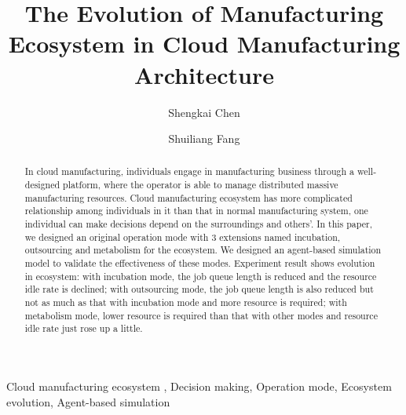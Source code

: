 
\title{The Evolution of Manufacturing Ecosystem in Cloud Manufacturing Architecture
}

\author[add1]{Shengkai Chen}
\author[add1,add2]{Shuiliang Fang}
\address[add2]{The State Key Laboratory of Fluid Power Transmission and Control, College of Mechanical Engineering, Zhejiang University, Hangzhou, 310027, China}
\address[add1]{Key Laboratory of Advanced Manufacturing Technology of Zhejiang Province, College of Mechanical Engineering, Zhejiang University, Hangzhou , 310027, China}



\begin{abstract}
In cloud manufacturing, individuals engage in manufacturing business through a well-designed platform, where the operator is able to manage distributed massive manufacturing resources. 
Cloud manufacturing ecosystem has more complicated relationship among individuals in it than that in normal manufacturing system, one individual can make decisions depend on the surroundings and others'. In this paper, we designed an original operation mode with 3 extensions named incubation, outsourcing and metabolism for the ecosystem. We designed an agent-based simulation model to validate the effectiveness of these modes. Experiment result shows evolution in ecosystem: with incubation mode, the job queue length is reduced and the resource idle rate is declined; with outsourcing mode, the job queue length is also reduced but not as much as that with incubation mode and more resource is required; with metabolism mode, lower resource is required than that with other modes and resource idle rate just rose up a little.

\end{abstract}

\begin{keyword}
Cloud manufacturing ecosystem \sep
Decision making\sep
Operation mode\sep
Ecosystem evolution\sep
Agent-based simulation

\end{keyword}
